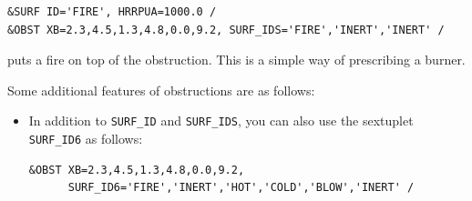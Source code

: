 \documentclass[11pt]{book}
\newcommand{\ct}{\tt\small}
\begin{document}
\footnotesize
\begin{verbatim}
&SURF ID='FIRE', HRRPUA=1000.0 /
&OBST XB=2.3,4.5,1.3,4.8,0.0,9.2, SURF_IDS='FIRE','INERT','INERT' /
\end{verbatim}
\normalsize

\noindent
puts a fire on top of the obstruction. This is a simple way of
prescribing a burner.

\vspace{\baselineskip}
\noindent
Some additional features of obstructions are as follows:
\begin{itemize}
\item In addition to {\ct SURF\_ID} and {\ct SURF\_IDS}, you can also use
the sextuplet {\ct SURF\_ID6} as follows:

\footnotesize
\begin{verbatim}
&OBST XB=2.3,4.5,1.3,4.8,0.0,9.2,
      SURF_ID6='FIRE','INERT','HOT','COLD','BLOW','INERT' /
\end{verbatim}
\normalsize


\end{itemize}
\end{document}
